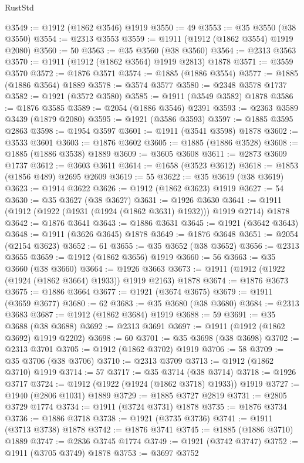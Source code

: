 \begin{lexlean}{RustStd}
\begin{coremodule}
@3549 := @1912 (@1862 @3546) @1919
@3550 := 49
@3553 := @35 @3550 (@38 @3550)
@3554 := @2313 @3553
@3559 := @1911 (@1912 (@1862 @3554) @1919 @2080)
@3560 := 50
@3563 := @35 @3560 (@38 @3560)
@3564 := @2313 @3563
@3570 := @1911 (@1912 (@1862 @3564) @1919 @2813) @1878
@3571 := @3559 @3570
@3572 := @1876 @3571
@3574 := @1885 (@1886 @3554)
@3577 := @1885 (@1886 @3564) @1889
@3578 := @3574 @3577
@3580 := @2348 @3578 @1737
@3582 := @1921 (@3572 @3580)
@3585 := @1911 (@3549 @3582) @1878
@3586 := @1876 @3585
@3589 := @2054 (@1886 @3546) @2391
@3593 := @2363 @3589 @3439 (@1879 @2080)
@3595 := @1921 (@3586 @3593)
@3597 := @1885 @3595 @2863
@3598 := @1954 @3597
@3601 := @1911 (@3541 @3598) @1878
@3602 := @3533 @3601
@3603 := @1876 @3602
@3605 := @1885 (@1886 @3528)
@3608 := @1885 (@1886 @3538) @1889
@3609 := @3605 @3608
@3611 := @2873 @3609 @1737
@3612 := @3603 @3611
@3614 := @1658 (@3523 @3612)
@3618 := @1853 (@1856 @489) @2695 @2609
@3619 := 55
@3622 := @35 @3619 (@38 @3619)
@3623 := @1914 @3622
@3626 := @1912 (@1862 @3623) @1919
@3627 := 54
@3630 := @35 @3627 (@38 @3627)
@3631 := @1926 @3630
@3641 := @1911 (@1912 (@1922 (@1931 (@1924 (@1862 @3631) @1932))) @1919 @2714) @1878
@3642 := @1876 @3641
@3643 := @1886 @3631
@3645 := @1921 (@3642 @3643)
@3648 := @1911 (@3626 @3645) @1878
@3649 := @1876 @3648
@3651 := @2054 (@2154 @3623)
@3652 := 61
@3655 := @35 @3652 (@38 @3652)
@3656 := @2313 @3655
@3659 := @1912 (@1862 @3656) @1919
@3660 := 56
@3663 := @35 @3660 (@38 @3660)
@3664 := @1926 @3663
@3673 := @1911 (@1912 (@1922 (@1924 (@1862 @3664) @1933)) @1919 @2163) @1878
@3674 := @1876 @3673
@3675 := @1886 @3664
@3677 := @1921 (@3674 @3675)
@3679 := @1911 (@3659 @3677)
@3680 := 62
@3683 := @35 @3680 (@38 @3680)
@3684 := @2313 @3683
@3687 := @1912 (@1862 @3684) @1919
@3688 := 59
@3691 := @35 @3688 (@38 @3688)
@3692 := @2313 @3691
@3697 := @1911 (@1912 (@1862 @3692) @1919 @2202)
@3698 := 60
@3701 := @35 @3698 (@38 @3698)
@3702 := @2313 @3701
@3705 := @1912 (@1862 @3702) @1919
@3706 := 58
@3709 := @35 @3706 (@38 @3706)
@3710 := @2313 @3709
@3713 := @1912 (@1862 @3710) @1919
@3714 := 57
@3717 := @35 @3714 (@38 @3714)
@3718 := @1926 @3717
@3724 := @1912 (@1922 (@1924 (@1862 @3718) @1933)) @1919
@3727 := @1940 (@2806 @1031) @1889
@3729 := @1885 @3727 @2819
@3731 := @2805 @3729 @1774
@3734 := @1911 (@3724 @3731) @1878
@3735 := @1876 @3734
@3736 := @1886 @3718
@3738 := @1921 (@3735 @3736)
@3741 := @1911 (@3713 @3738) @1878
@3742 := @1876 @3741
@3745 := @1885 (@1886 @3710) @1889
@3747 := @2836 @3745 @1774
@3749 := @1921 (@3742 @3747)
@3752 := @1911 (@3705 @3749) @1878
@3753 := @3697 @3752

\end{coremodule}
\end{lexlean}
